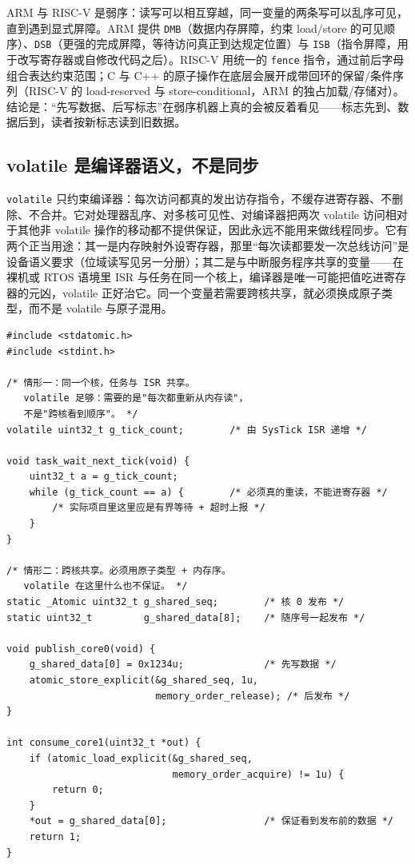 \documentclass[12pt,a4paper,fontset=fandol]{ctexbook}
\newcommand{\Tp}[1]{\texttt{#1}}
\newcommand{\Lang}[1]{\textsf{#1}}
\newcommand{\DomRtos}{\Lang{RTOS}}
\begin{document}
ARM 与 RISC-V 是弱序：读写可以相互穿越，同一变量的两条写可以乱序可见，直到遇到显式屏障。ARM 提供 \Tp{DMB}（数据内存屏障，约束 load/store 的可见顺序）、\Tp{DSB}（更强的完成屏障，等待访问真正到达规定位置）与 \Tp{ISB}（指令屏障，用于改写寄存器或自修改代码之后）。RISC-V 用统一的 \Tp{fence} 指令，通过前后字母组合表达约束范围；\Lang{C} 与 \Lang{C++} 的原子操作在底层会展开成带回环的保留/条件序列（RISC-V 的 load-reserved 与 store-conditional，ARM 的独占加载/存储对）。结论是：“先写数据、后写标志”在弱序机器上真的会被反着看见——标志先到、数据后到，读者按新标志读到旧数据。

\subsection*{volatile 是编译器语义，不是同步}

\begin{note}[title={volatile 与 atomic 的分工}]
\Tp{volatile} 只约束编译器：每次访问都真的发出访存指令，不缓存进寄存器、不删除、不合并。它对处理器乱序、对多核可见性、对编译器把两次 volatile 访问相对于其他非 volatile 操作的移动都不提供保证，因此永远不能用来做线程同步。它有两个正当用途：其一是内存映射外设寄存器，那里“每次读都要发一次总线访问”是设备语义要求（位域读写见另一分册）；其二是与中断服务程序共享的变量——在裸机或 \DomRtos{} 语境里 ISR 与任务在同一个核上，编译器是唯一可能把值吃进寄存器的元凶，volatile 正好治它。同一个变量若需要跨核共享，就必须换成原子类型，而不是 volatile 与原子混用。
\end{note}

\begin{lstlisting}[style=cstyle,caption={C：与 ISR 共享的标志用 volatile，跨核发布用 stdatomic},label={lst:ch09-atomic-iso}]
#include <stdatomic.h>
#include <stdint.h>

/* 情形一：同一个核，任务与 ISR 共享。
   volatile 足够：需要的是"每次都重新从内存读"，
   不是"跨核看到顺序"。 */
volatile uint32_t g_tick_count;        /* 由 SysTick ISR 递增 */

void task_wait_next_tick(void) {
    uint32_t a = g_tick_count;
    while (g_tick_count == a) {        /* 必须真的重读，不能进寄存器 */
        /* 实际项目里这里应是有界等待 + 超时上报 */
    }
}

/* 情形二：跨核共享。必须用原子类型 + 内存序。
   volatile 在这里什么也不保证。 */
static _Atomic uint32_t g_shared_seq;        /* 核 0 发布 */
static uint32_t         g_shared_data[8];    /* 随序号一起发布 */

void publish_core0(void) {
    g_shared_data[0] = 0x1234u;              /* 先写数据 */
    atomic_store_explicit(&g_shared_seq, 1u,
                          memory_order_release); /* 后发布 */
}

int consume_core1(uint32_t *out) {
    if (atomic_load_explicit(&g_shared_seq,
                             memory_order_acquire) != 1u) {
        return 0;
    }
    *out = g_shared_data[0];                 /* 保证看到发布前的数据 */
    return 1;
}
\end{lstlisting}
\end{document}
